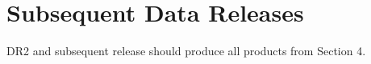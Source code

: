 \section{Subsequent Data Releases } \label{sect:drn}
DR2 and subsequent release should produce all products from \DPDD Section 4.
